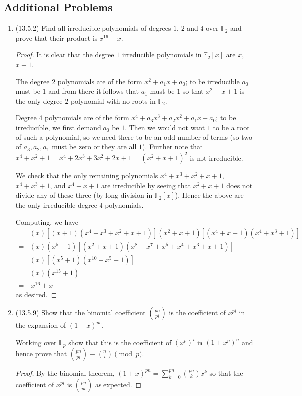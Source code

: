 \documentclass[11pt]{article}
\begin{document}
\subsection*{Additional Problems}
\begin{enumerate}
    \item (13.5.2) Find all irreducible polynomials of degrees $1$, $2$ and $4$ over $\mathbb{F}_2$ and prove that their product is $x^{16}-x$. \begin{proof}
        It is clear that the degree $1$ irreducible polynomials in $\mathbb{F}_2[x]$ are $x$, $x+1$.

        The degree $2$ polynomials are of the form $x^2+a_1x + a_0$; to be irreducible $a_0$ must be $1$ and from there it follows that $a_1$ must be $1$ so that $x^2+x+1$ is the only degree $2$ polynomial with no roots in $\mathbb{F}_2$.

        Degree $4$ polynomials are of the form $x^4+a_3x^3+a_2x^2+a_1x + a_0$; to be irreducible, we first demand $a_0$ be $1$. Then we would not want $1$ to be a root of such a polynomial, so we need there to be an odd number of terms (so two of $a_3,a_2,a_1$ must be zero or they are all $1$). Further note that $x^4+x^2+1 = x^4+2x^3+3x^2+2x+1 = (x^2+x+1)^2$ is not irreducible.

        We check that the only remaining polynomials $x^4+x^3+x^2+x+1$, $x^4+x^3+1$, and $x^4+x+1$ are irreducible by seeing that $x^2+x+1$ does not divide any of these three (by long division in $\mathbb{F}_2[x]$). Hence the above are the only irreducible degree $4$ polynomials.

        Computing, we have \begin{align*}
            &(x)[(x+1)(x^4+x^3+x^2+x+1)](x^2+x+1)[(x^4+x+1)(x^4+x^3+1)] \\
            =&(x)(x^5+1)[(x^2+x+1)(x^8+x^7+x^5+x^4+x^3+x+1)]\\
            =&(x)[(x^5+1)(x^{10}+x^5+1)]\\
            =&(x)(x^{15}+1)\\
            =&~x^{16}+x
        \end{align*} as desired.
    \end{proof}
    \item (13.5.9) Show that the binomial coefficient $\binom{pn}{pi}$ is the coefficient of $x^{pi}$ in the expansion of $(1+x)^{pn}$.
    
    Working over $\mathbb{F}_p$ show that this is the coefficient of $(x^p)^i$ in $(1+x^p)^n$ and hence prove that $\binom{pn}{pi}\equiv \binom{n}{i}\pmod p$. \begin{proof}
        By the binomial theorem, $(1+x)^{pn} = \sum_{k=0}^{pn}\binom{pn}{k}x^k$ so that the coefficient of $x^{pi}$ is $\binom{pn}{pi}$ as expected. 


\end{proof}
\end{enumerate}
\end{document}
